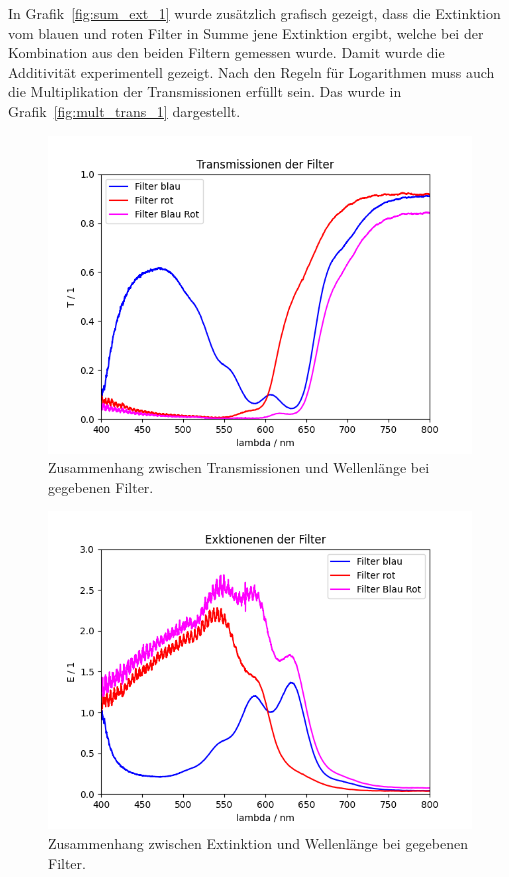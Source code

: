 \documentclass{article}
\begin{document}
In Grafik~\ref{fig:sum_ext_1} wurde zusätzlich grafisch gezeigt, dass die Extinktion vom blauen und roten Filter in Summe jene Extinktion ergibt, welche bei der Kombination aus den beiden Filtern gemessen wurde. Damit wurde die Additivität experimentell gezeigt. Nach den Regeln für Logarithmen muss auch die Multiplikation der Transmissionen erfüllt sein. Das wurde in Grafik~\ref{fig:mult_trans_1} dargestellt.




\begin{figure}[H]
\centering
\caption{Zusammenhang zwischen Transmissionen und Wellenlänge bei gegebenen Filter.}
\label{fig:T_Farben}
\includegraphics[scale=0.6]{FF_Transmissionen.png}
\end{figure}



\begin{figure}[H]
\centering
\caption{Zusammenhang zwischen Extinktion und Wellenlänge bei gegebenen Filter.}
\label{fig:Ext}
\includegraphics[scale=0.6]{FF_Extinktionen.png}
\end{figure}
\end{document}
